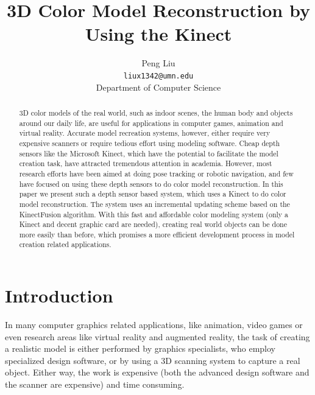 \documentclass[12pt]{article}
\title{3D Color Model Reconstruction by Using the Kinect}
\author{ \parbox{3.5 in}{\centering Peng Liu\\
    {\tt\small liux1342@umn.edu}\\
  Department of Computer Science}
}
\date{ }
\begin{document}
\maketitle

\begin{abstract}
3D color models of the real world, such as indoor scenes, the human  body and objects around  our daily life, are useful for applications in computer games,  animation and  virtual  reality. Accurate model recreation systems, however, either require very expensive scanners or require tedious effort using modeling software. Cheap depth  sensors like the Microsoft Kinect,  which have the potential to facilitate the model creation task, have attracted tremendous attention in academia. However, most research efforts have been aimed at doing pose tracking or robotic navigation, and few have focused on using these depth sensors to do color model reconstruction. In this paper we present such a depth sensor based system, which uses a Kinect to do color model reconstruction. The system uses an incremental updating scheme based on the KinectFusion algorithm\cite{Newcombe2011}. With this fast and affordable color modeling system (only a Kinect and decent graphic card are needed), creating real world objects can be done more easily than before, which promises a more efficient development process in model creation related applications.
\end{abstract}

\section{Introduction}
In many computer graphics related applications, like animation, video games or even research areas like virtual reality and augmented reality, the task of creating a realistic model is either performed by graphics specialists, who employ specialized design software, or by using a 3D scanning system to capture a real object. Either way, the work is expensive (both the advanced design software and the scanner are expensive) and time consuming.
\end{document}
